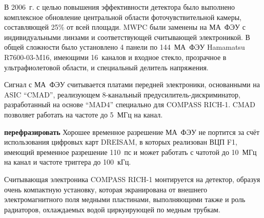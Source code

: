 
В 2006~г. с целью повышения эффективности детектора было выполнено комплексное обновление центральной области фоточувствительной камеры, составляющей 25\% от всей площади. MWPC были заменены на МА~ФЭУ с индивидуальными линзами и соответствующей считывающей электроникой. В общей сложности было установлено 4 панели по 144~МА~ФЭУ Hamamatsu R7600-03-M16, имеющими 16~каналов и входное стекло, прозрачное в ультрафиолетовой области, и специальный делитель напряжения.


Сигнал с МА~ФЭУ считывается платами передней электроники, основанными на ASIC ``CMAD'', реализующем 8-канальный предусилитель-дискриминатор, разработанный на основе ``MAD4'' специально для COMPASS \mbox{RICH-1}. CMAD позволяет работать на частоте до 5~МГц на канал.


\todo \textbf{перефразировать}
Хорошее временное разрешение МА~ФЭУ не портится за счёт использования цифровых карт DREISAM, в которых реализован ВЦП F1, имеющий временное разрешение 110~пс и может работать с чатотой до 10~МГц на канал и частоте триггера до 100~кГц.


Считывающая электроника COMPASS \mbox{RICH-1} монтируется на детектор, образуя очень компактную установку, которая экранирована от внешнего электромагнитного поля медными пластинами, выполняющими также и роль радиаторов, охлаждаемых водой циркуирующей по медным трубкам.

